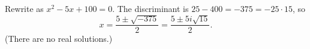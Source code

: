 Rewrite as $x^2-5x+100=0$. The discriminant is $25-400=-375=-25\cdot15$, so
\[x=\dfrac{5\pm\sqrt{-375}}{2}=\boxed{\dfrac{5\pm5i\sqrt{15}}{2}}.\]
(There are no real solutions.)
